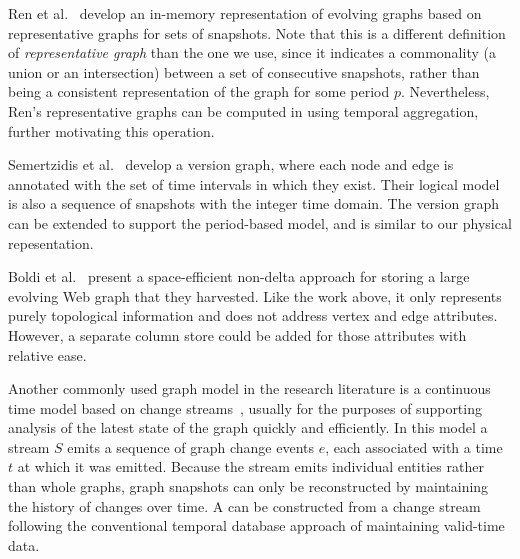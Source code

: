 Ren et al.~\cite{Ren2011} develop an in-memory representation of
evolving graphs based on representative graphs for sets of snapshots.
Note that this is a different definition of {\em representative graph}
than the one we use, since it indicates a commonality (a union or an
intersection) between a set of consecutive snapshots, rather than
being a consistent representation of the graph for some period $p$.
Nevertheless, Ren's representative graphs can be computed in \ql using
temporal aggregation, further motivating this operation.

Semertzidis et al.~\cite{Semertzidis2015} develop a version graph,
where each node and edge is annotated with the set of time intervals
in which they exist.  Their logical model is also a sequence of
snapshots with the integer time domain. The version graph can be
extended to support the period-based model, and is similar to our \og
physical repesentation.

Boldi et al.~\cite{Boldi2008} present a space-efficient non-delta
approach for storing a large evolving Web graph that they harvested.
Like the work above, it only represents purely topological information
and does not address vertex and edge attributes.  However, a separate
column store could be added for those attributes with relative ease.

Another commonly used graph model in the research literature is a
continuous time model based on change
streams~\cite{Cheng2012,Ediger2012}, usually for the purposes of
supporting analysis of the latest state of the graph quickly and
efficiently.  In this model a stream $S$ emits a sequence of graph
change events $e$, each associated with a time $t$ at which it was
emitted.  Because the stream emits individual entities rather than
whole graphs, graph snapshots can only be reconstructed by maintaining
the history of changes over time.  A \tg can be constructed from a
change stream following the conventional temporal database approach of
maintaining valid-time data.


